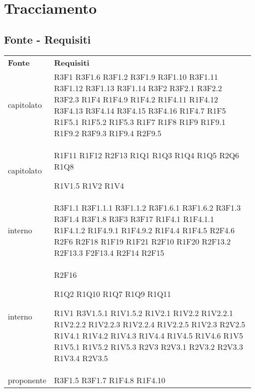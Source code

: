 \section{Tracciamento}
	\subsection{Fonte - Requisiti}
	\begin{longtable} {
		>{\centering}p{28mm}  
		>{}p{20mm}
		}
	\rowcolor{gray!50}
		\textbf{Fonte} & \textbf{Requisiti}	\TBstrut \\

		capitolato & 
		R3F1
		R3F1.6
		R3F1.2
		R3F1.9
		R3F1.10
		R3F1.11
		R3F1.12
		R3F1.13
		R3F1.14
		R3F2
		R3F2.1
		R3F2.2
		R3F2.3
		R1F4
		R1F4.9
		R1F4.2
		R1F4.11
		R1F4.12
		R3F4.13
		R3F4.14
		R3F4.15
		R3F4.16
		R1F4.7
		R1F5 
		R1F5.1
		R1F5.2
		R1F5.3
		R1F7
		R1F8
		R1F9
		R1F9.1
		R1F9.2
		R3F9.3
		R1F9.4
		R2F9.5  \TBstrut \\ [2mm]

		capitolato &
		R1F11
		R1F12
		R2F13
		R1Q1 
		R1Q3 
		R1Q4 
		R1Q5 
		R2Q6
		R1Q8
		 
		R1V1.5
		R1V2
		R1V4 \TBstrut \\ [2mm]
				
		interno & 
		R3F1.1
		R3F1.1.1
		R3F1.1.2
		R3F1.6.1
		R3F1.6.2
		R3F1.3
		R3F1.4
		R3F1.8
		R3F3
		R3F17
		R1F4.1
		R1F4.1.1
		R1F4.1.2
		R1F4.9.1
		R1F4.9.2
		R1F4.4
		R1F4.5
		R2F4.6
		R2F6
		R2F18
		R1F19
		R1F21  
		R2F10
		R1F20
		R2F13.2
		R2F13.3
		F2F13.4
		R2F14
		R2F15 \TBstrut \\ [2mm]

		interno &
		R2F16
		
		R1Q2 
		R1Q10
		R1Q7
		R1Q9
		R1Q11

		R1V1
		R3V1.5.1
		R1V1.5.2 
		R1V2.1 
		R1V2.2 
		R1V2.2.1 
		R1V2.2.2 
		R1V2.2.3 
		R1V2.2.4 
		R1V2.2.5 
		R1V2.3 
		R2V2.5 
		R1V4.1
		R1V4.2
		R1V4.3
		R1V4.4
		R1V4.5
		R1V4.6
		R1V5
		R1V5.1
		R1V5.2
		R1V5.3
		R2V3 
		R2V3.1 
		R2V3.2 
		R2V3.3
		R1V3.4
		R2V3.5 \TBstrut \\ [2mm]

		proponente &
		R3F1.5
		R3F1.7
		R1F4.8
		R1F4.10 \TBstrut \\ [2mm]
				

\end{longtable}
